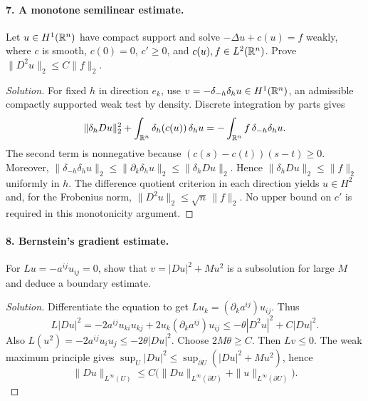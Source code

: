 \Needspace{30mm}
\paragraph{7. A monotone semilinear estimate.}
Let $u\in H^1(\mathbb{R}^n)$ have compact support and solve
$-\Delta u+c(u)=f$ weakly, where $c$ is smooth, $c(0)=0$, $c'\geq0$,
and $c(u),f\in L^2(\mathbb{R}^n)$. Prove $\|D^2u\|_2\leq C\|f\|_2$.
\begin{proof}[Solution]
For fixed $h$ in direction $e_k$, use
$v=-\delta_{-h}\delta_hu\in H^1(\mathbb{R}^n)$, an admissible compactly
supported weak test by density.
Discrete integration by parts gives
\[
 \|\delta_hDu\|_2^2+
 \int_{\mathbb{R}^n}\delta_h(c(u))\,\delta_hu
 =-\int_{\mathbb{R}^n}f\,\delta_{-h}\delta_hu.
\]
The second term is nonnegative because
$(c(s)-c(t))(s-t)\geq0$. Moreover,
$\|\delta_{-h}\delta_hu\|_2\leq\|\partial_k\delta_hu\|_2
\leq\|\delta_hDu\|_2$.
Hence $\|\delta_hDu\|_2\leq\|f\|_2$ uniformly in $h$.
The difference quotient criterion in each direction yields $u\in H^2$ and,
for the Frobenius norm, $\|D^2u\|_2\leq\sqrt n\,\|f\|_2$.
No upper bound on $c'$ is required in this monotonicity argument.
\end{proof}
\Needspace{45mm}

\Needspace{30mm}
\paragraph{8. Bernstein's gradient estimate.}
For $Lu=-a^{ij}u_{ij}=0$, show that
$v=|Du|^2+Mu^2$ is a subsolution for large $M$ and deduce a boundary estimate.
\begin{proof}[Solution]
Differentiate the equation to get
$Lu_k=(\partial_k a^{ij})u_{ij}$. Thus
\[
 L|Du|^2
 =-2a^{ij}u_{ki}u_{kj}
       +2u_k(\partial_k a^{ij})u_{ij}
 \leq-\theta|D^2u|^2+C|Du|^2 .
\]
Also $L(u^2)=-2a^{ij}u_i u_j\leq-2\theta|Du|^2$.
Choose $2M\theta\geq C$. Then $Lv\leq0$.
The weak maximum principle gives
$\sup_U|Du|^2\leq\sup_{\partial U}(|Du|^2+Mu^2)$, hence
\[
 \|Du\|_{L^\infty(U)}
 \leq C\bigl(\|Du\|_{L^\infty(\partial U)}
               +\|u\|_{L^\infty(\partial U)}\bigr).
\]
\end{proof}

\Needspace{30mm}
